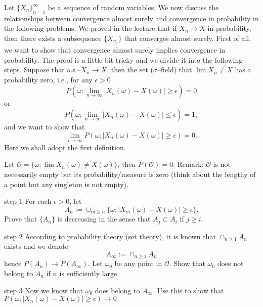 \problem\label{pb:a.s. implies in prob}
\begin{question}
    Let $\{X_n\}_{n=1}^\infty$ be a sequence of random variables. We now discuss the
    relationships between convergence almost surely and convergence in probability in
    the following problems.  We proved in the lecture that if $X_n\rightarrow X$ in
    probability, then there exists a subsequence $\{X_{n_j}\}$ that converges almost surely.
    First of all, we want to show that convergence almost surely implies convergence in probability.
    The proof is a little bit tricky and we divide it into the following steps.  Suppose that a.s.--$X_n\rightarrow X$,
    then the set ($\sigma$--field) that $\lim X_n\neq X$ has a probability zero, i.e.,
    for any $\epsilon>0$
    \[P(\omega;\lim_{n\rightarrow \infty} |X_n(\omega)-X(\omega)|\geq\epsilon)=0\]
    or \[P(\omega;\lim_{n\rightarrow \infty} |X_n(\omega)-X(\omega)|\leq\epsilon)=1,\]
    and we want to show that
    \[\lim_{i\rightarrow \infty }P(\omega;|X_n(\omega)-X(\omega)|\geq\epsilon)=0.\]
    Here we shall adopt the first definition.

    Let $\mathcal O=\{\omega;\lim X_n(\omega)\neq X(\omega)\}$, then $P(\mathcal O)=0$.
    Remark: $\mathcal O$ is not necessarily empty but its probability/measure is zero
    (think about the lengthy of a point but any singleton is not empty).

    step 1  For each $\epsilon>0$, let \[A_n:=\cup_{m\geq n}\{\omega;|X_m(\omega)-X(\omega)|\geq\epsilon\}.\]
    Prove that $\{A_n\}$ is decreasing in the sense that $A_j\subset A_i$ if $j\geq i$.

    step 2  According to probability theory (set theory), it is known that $\cap_{n\geq1} A_n$ exists and we denote
    \[A_\infty:=\cap_{n\geq1} A_n\]
    hence $P(A_n)\rightarrow P(A_\infty)$.  Let $\omega_0$ be any point in $\mathcal O$.  Show that $\omega_0$ does
    not belong to $A_n$ if $n$ is sufficiently large.

    step 3  Now we know that $\omega_0$ does belong to $A_\infty$.  Use this to show that
    $P(\omega;|X_n(\omega)-X(\omega)|\geq\epsilon)\rightarrow 0$
\end{question}

